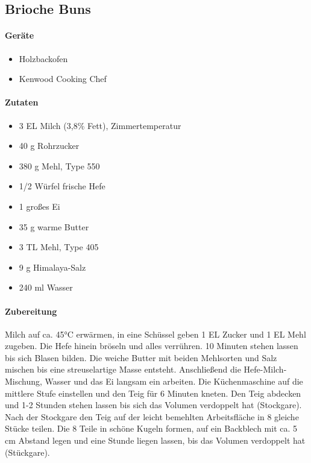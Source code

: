 \subsection{Brioche Buns}\label{BriocheBun}

\paragraph{Geräte}

\begin{itemize}[noitemsep]
	\item Holzbackofen
	\item Kenwood Cooking Chef
\end{itemize}

\paragraph{Zutaten}

\begin{itemize}[noitemsep]
	\item 3 EL Milch (3,8\% Fett), Zimmertemperatur
	\item 40 g Rohrzucker
	\item 380 g Mehl, Type 550
	\item 1/2 Würfel frische Hefe
	\item 1 großes Ei
	\item 35 g warme Butter
	\item 3 TL Mehl, Type 405
	\item 9 g Himalaya-Salz
	\item 240 ml Wasser
\end{itemize}

\paragraph{Zubereitung}

Milch auf ca. 45°C erwärmen, in eine Schüssel geben 1 EL Zucker und 1 EL Mehl
zugeben. Die Hefe hinein bröseln und alles verrühren. 10 Minuten stehen lassen
bis sich Blasen bilden. 
Die weiche Butter mit beiden Mehlsorten und Salz mischen bis eine streuselartige
Masse entsteht. Anschließend die Hefe-Milch-Mischung, Wasser und das Ei
langsam ein arbeiten. Die Küchenmaschine auf die mittlere Stufe einstellen und 
den Teig für 6 Minuten kneten. Den Teig abdecken und 1-2 Stunden stehen lassen
bis sich das Volumen verdoppelt hat (Stockgare).
Nach der Stockgare den Teig auf der leicht bemehlten Arbeitsfläche in 8 gleiche Stücke
teilen. Die 8 Teile in schöne Kugeln formen, auf ein Backblech mit ca. 5 cm Abstand legen
und eine Stunde liegen lassen, bis das Volumen verdoppelt hat (Stückgare).


